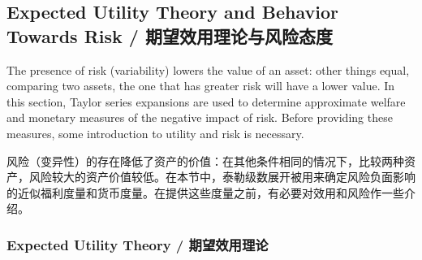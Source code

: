 \subsection{Expected Utility Theory and Behavior Towards Risk / 期望效用理论与风险态度}

\begin{original}
The presence of risk (variability) lowers the value of an asset: other things equal, comparing two assets, the one that has greater risk will have a lower value. In this section, Taylor series expansions are used to determine approximate welfare and monetary measures of the negative impact of risk. Before providing these measures, some introduction to utility and risk is necessary.
\end{original}
\begin{translation}
风险（变异性）的存在降低了资产的价值：在其他条件相同的情况下，比较两种资产，风险较大的资产价值较低。在本节中，泰勒级数展开被用来确定风险负面影响的近似福利度量和货币度量。在提供这些度量之前，有必要对效用和风险作一些介绍。
\end{translation}

\subsubsection{Expected Utility Theory / 期望效用理论}


